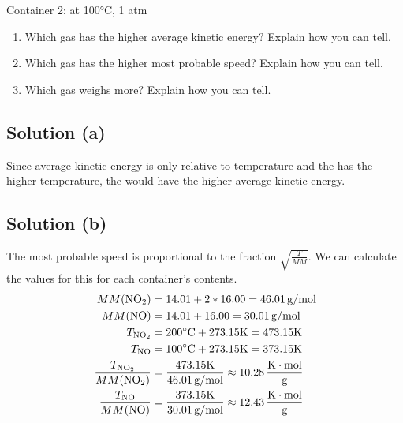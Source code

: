 \documentclass[10pt]{article}
\begin{document}
        Container 2:  at 100\unit{\celsius}, 1 atm
        
        \begin{enumerate} [label=\alph*)]
            \item Which gas has the higher average kinetic energy? Explain how you can tell.
            \item Which gas has the higher most probable speed? Explain how you can tell.
            \item Which gas weighs more? Explain how you can tell.
        \end{enumerate}

        \subsection{Solution (a)}
            Since average kinetic energy is only relative to temperature and the  has the higher temperature, the  would have the higher average kinetic energy. 

        \subsection{Solution (b)}
            The most probable speed is proportional to the fraction $\sqrt{\frac{T}{MM}}$. 
            We can calculate the values for this for each container's contents.
            \begin{align}
                MM(\ce{NO2})&=  14.01 + 2 * 16.00
                    =   46.01\,\unit{\gram/\mole}\\
                MM(\ce{NO}) &=  14.01 + 16.00
                    =   30.01\,\unit{\gram/\mole}\\
                T_{\ce{NO2}}&=  200\unit{\celsius} + 273.15\unit{\kelvin}
                    =   473.15\unit{\kelvin}\\
                T_{\ce{NO}} &=  100\unit{\celsius} + 273.15\unit{\kelvin}
                    =   373.15\unit{\kelvin}\\
                \frac{T_{\ce{NO2}}}{MM(\ce{NO2})}   &=  \frac{473.15\unit{\kelvin}}{46.01\,\unit{\gram/\mole}}
                    \approx 10.28\,\unit{\frac{\kelvin\cdot\mole}{\gram}}\\
                \frac{T_{\ce{NO}}}{MM(\ce{NO})} &=  \frac{373.15\unit{\kelvin}}{30.01\,\unit{\gram/\mole}}
                    \approx 12.43\,\unit{\frac{\kelvin\cdot\mole}{\gram}}
            \end{align}
\end{document}
